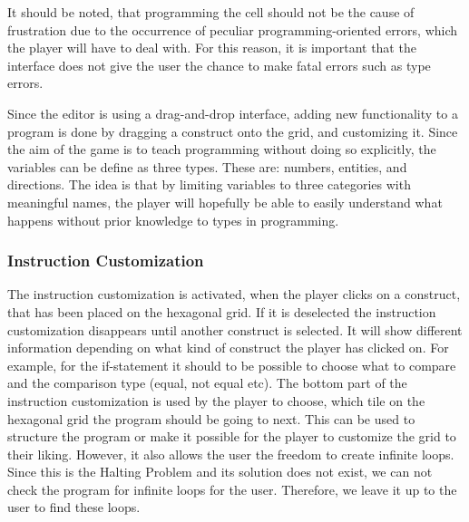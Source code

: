 It should be noted, that programming the cell should not be the cause of frustration due to the occurrence of peculiar programming-oriented errors, which the player will have to deal with.
For this reason, it is important that the interface does not give the user the chance to make fatal errors such as type errors.\newline

Since the editor is using a drag-and-drop interface, adding new functionality to a program is done by dragging a construct onto the grid, and customizing it.
Since the aim of the game is to teach programming without doing so explicitly, the variables can be define as three types.
These are: numbers, entities, and directions.
The idea is that by limiting variables to three categories with meaningful names, the player will hopefully be able to easily understand what happens without prior knowledge to types in programming.

\subsubsection*{Instruction Customization}
The instruction customization is activated, when the player clicks on a construct, that has been placed on the hexagonal grid.
If it is deselected the instruction customization disappears until another construct is selected.
It will show different information depending on what kind of construct the player has clicked on.
For example, for the if-statement it should to be possible to choose what to compare and the comparison type (equal, not equal etc).
The bottom part of the instruction customization is used by the player to choose, which tile on the hexagonal grid the program should be going to next.
This can be used to structure the program or make it possible for the player to customize the grid to their liking.
However, it also allows the user the freedom to create infinite loops.
Since this is the Halting Problem and its solution does not exist, we can not check the program for infinite loops for the user.
Therefore, we leave it up to the user to find these loops. 
